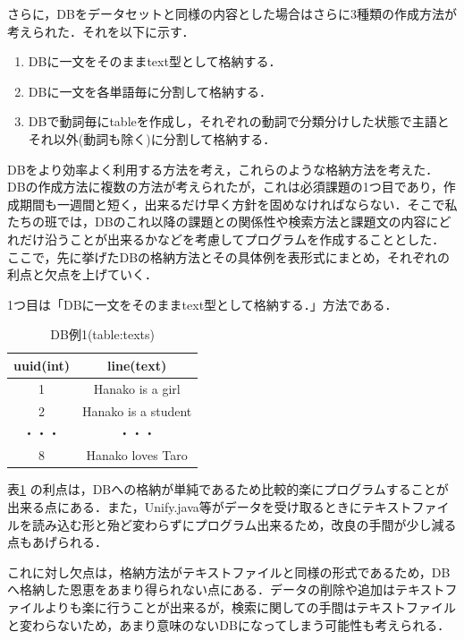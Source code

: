 \documentclass[12pt]{jarticle}
\begin{document}
さらに，DBをデータセットと同様の内容とした場合はさらに3種類の作成方法が考えられた．それを以下に示す．
\begin{enumerate}
\item DBに一文をそのままtext型として格納する．
\item DBに一文を各単語毎に分割して格納する．
\item DBで動詞毎にtableを作成し，それぞれの動詞で分類分けした状態で主語とそれ以外(動詞も除く)に分割して格納する．
\end{enumerate}
DBをより効率よく利用する方法を考え，これらのような格納方法を考えた．\\

DBの作成方法に複数の方法が考えられたが，これは必須課題の1つ目であり，作成期間も一週間と短く，出来るだけ早く方針を固めなければならない．そこで私たちの班では，DBのこれ以降の課題との関係性や検索方法と課題文の内容にどれだけ沿うことが出来るかなどを考慮してプログラムを作成することとした．\\

ここで，先に挙げたDBの格納方法とその具体例を表形式にまとめ，それぞれの利点と欠点を上げていく．\par
1つ目は「DBに一文をそのままtext型として格納する．」方法である．\\

\begin{table}[htb]
  \begin{center}
    \caption{DB例1(table:texts)}
    \begin{tabular}{|c|c|} \hline
      uuid(int) & line(text) \\ \hline \hline
      1 & Hanako is a girl \\ \hline
      2 & Hanako is a student \\ \hline
      ・・・ & ・・・ \\ \hline
	  8 & Hanako loves Taro \\ \hline
    \end{tabular}
    \label{tab:ex1}
  \end{center}
\end{table}

表\ref{tab:ex1} の利点は，DBへの格納が単純であるため比較的楽にプログラムすることが出来る点にある．また，Unify.java等がデータを受け取るときにテキストファイルを読み込む形と殆ど変わらずにプログラム出来るため，改良の手間が少し減る点もあげられる．\par
これに対し欠点は，格納方法がテキストファイルと同様の形式であるため，DBへ格納した恩恵をあまり得られない点にある．データの削除や追加はテキストファイルよりも楽に行うことが出来るが，検索に関しての手間はテキストファイルと変わらないため，あまり意味のないDBになってしまう可能性も考えられる．\\
\end{document}
